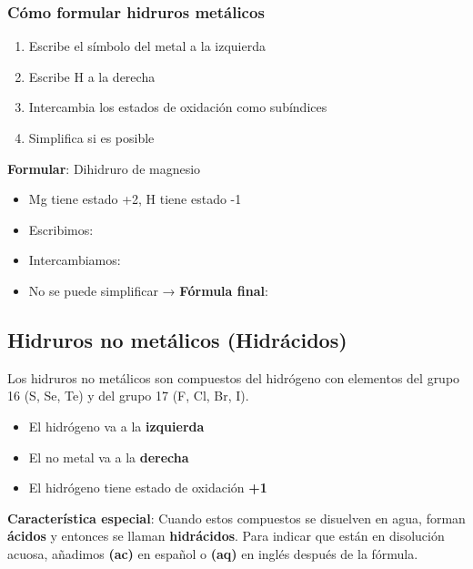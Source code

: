 \subsubsection{Cómo formular hidruros metálicos}

\begin{enumerate}
    \item Escribe el símbolo del metal a la izquierda
    \item Escribe H a la derecha
    \item Intercambia los estados de oxidación como subíndices
    \item Simplifica si es posible
\end{enumerate}

\begin{example}
    \textbf{Formular}: Dihidruro de magnesio

    \begin{itemize}
        \item Mg tiene estado +2, H tiene estado -1
        \item Escribimos:  
        \item Intercambiamos: 
        \item No se puede simplificar → \textbf{Fórmula final}: 
    \end{itemize}
\end{example}

\subsection{Hidruros no metálicos (Hidrácidos)}

Los hidruros no metálicos son compuestos del hidrógeno con elementos del grupo 16 (S, Se, Te) y del grupo 17 (F, Cl, Br, I).

\begin{itemize}
    \item El hidrógeno va a la \textbf{izquierda}
    \item El no metal va a la \textbf{derecha}
    \item El hidrógeno tiene estado de oxidación \textbf{+1}
\end{itemize}

\textbf{Característica especial}: Cuando estos compuestos se disuelven en agua, forman \textbf{ácidos} y entonces se llaman \textbf{hidrácidos}. Para indicar que están en disolución acuosa, añadimos \textbf{(ac)} en español o \textbf{(aq)} en inglés después de la fórmula.

